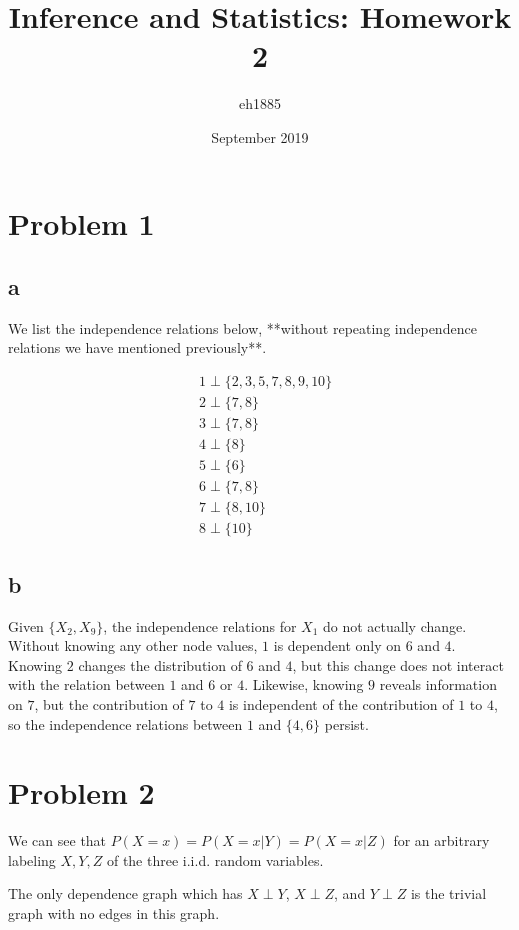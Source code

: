 \documentclass{article}
\title{Inference and Statistics: Homework 2}
\author{eh1885 }
\date{September 2019}
\begin{document}
\maketitle

\section{Problem 1}

\subsection{a} 

We list the independence relations below, **without repeating independence relations we have mentioned previously**.

\begin{align}
    &1 \perp \{2,3,5,7,8,9,10\} \\
    &2 \perp \{7,8\} \\
    &3 \perp \{7,8\} \\
    &4 \perp \{8\} \\
    &5 \perp \{6\} \\
    &6 \perp \{7, 8\} \\
    &7 \perp \{8, 10\} \\
    &8 \perp \{10\}
\end{align}

\subsection{b}
Given $\{X_2, X_9\}$, the independence relations for $X_1$ do not actually change. Without knowing any other node values, $1$ is dependent only on $6$ and $4$. Knowing $2$ changes the distribution of $6$ and $4$, but this change does not interact with the relation between $1$ and $6$ or $4$. Likewise, knowing $9$ reveals information on $7$, but the contribution of $7$ to $4$ is independent of the contribution of $1$ to $4$, so the independence relations between $1$ and $\{4, 6\}$ persist.

\section{Problem 2}
We can see that $P(X = x) = P(X = x | Y) = P(X = x | Z)$ for an arbitrary labeling $X, Y, Z$ of the three i.i.d. random variables. 

The only dependence graph which has $X \perp Y$, $X \perp Z$, and $Y \perp Z$ is the trivial graph with no edges in this graph.
\end{document}
